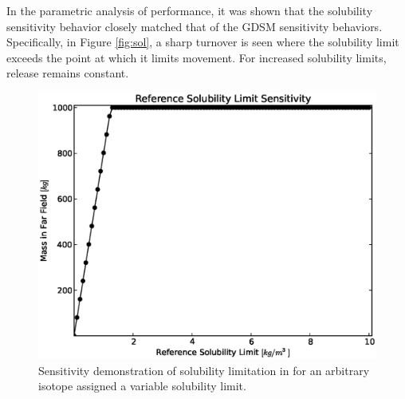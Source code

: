 In the parametric analysis of \Cyder performance, it was shown that the 
solubility sensitivity behavior closely matched that of the \gls{GDSM} 
sensitivity behaviors. Specifically, in Figure \ref{fig:sol}, a sharp turnover 
is seen where the solubility limit exceeds the point at which it limits 
movement. For increased solubility limits, release remains constant.

\begin{figure}[htbp!]
\begin{center}
\includegraphics[width=0.7\linewidth]{./chapters/demonstration/bench/sol.eps}
\end{center}
\caption{Sensitivity demonstration of solubility limitation in \Cyder for an 
arbitrary isotope assigned a variable solubility limit. }
\label{fig:sol_result}
\end{figure}


